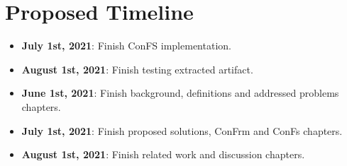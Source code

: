 \section{Proposed Timeline}
\begin{itemize}
	\item \textbf{July 1st, 2021}: Finish ConFS implementation.
	\item \textbf{August 1st, 2021}: Finish testing extracted artifact.
	\item \textbf{June 1st, 2021}: Finish background, definitions and addressed problems chapters.
	\item \textbf{July 1st, 2021}: Finish proposed solutions, ConFrm and ConFs chapters.
	\item \textbf{August 1st, 2021}: Finish related work and discussion chapters.
\end{itemize}